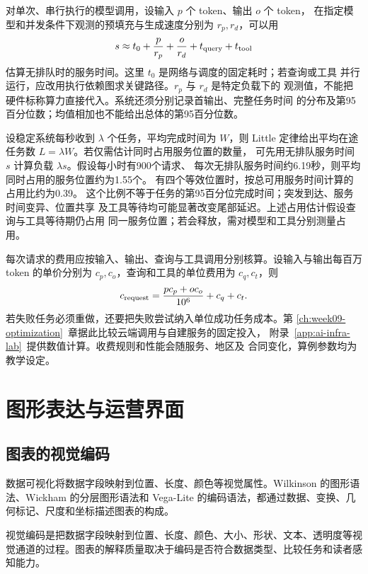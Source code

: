 对单次、串行执行的模型调用，设输入 \(p\) 个 token、输出 \(o\) 个 token，
在指定模型和并发条件下观测的预填充与生成速度分别为 \(r_p,r_d\)，可以用
\[
  s\approx t_0+\frac{p}{r_p}+\frac{o}{r_d}
       +t_{\rm query}+t_{\rm tool}
\]
估算无排队时的服务时间。这里 \(t_0\) 是网络与调度的固定耗时；若查询或工具
并行运行，应改用执行依赖图求关键路径。\(r_p\) 与 \(r_d\) 是特定负载下的
观测值，不能把硬件标称算力直接代入。系统还须分别记录首输出、完整任务时间
的分布及第95百分位数；均值相加也不能给出总体的第95百分位数。

设稳定系统每秒收到 \(\lambda\) 个任务，平均完成时间为 \(W\)，则 Little
定律给出平均在途任务数 \(L=\lambda W\)。若仅需估计同时占用服务位置的数量，
可先用无排队服务时间 \(s\) 计算负载 \(\lambda s\)。假设每小时有900个请求、
每次无排队服务时间约6.19秒，则平均同时占用的服务位置约为1.55个。
有四个等效位置时，按总可用服务时间计算的占用比约为0.39。
这个比例不等于任务的第95百分位完成时间；突发到达、服务时间变异、位置共享
及工具等待均可能显著改变尾部延迟。上述占用估计假设查询与工具等待期仍占用
同一服务位置；若会释放，需对模型和工具分别测量占用。

每次请求的费用应按输入、输出、查询与工具调用分别核算。设输入与输出每百万 token 的单价分别为
\(c_p,c_o\)，查询和工具的单位费用为 \(c_q,c_t\)，则
\[
  c_{\rm request}=
    \frac{p c_p+o c_o}{10^6}+c_q+c_t.
\]
若失败任务必须重做，还要把失败尝试纳入单位成功任务成本。第
\ref{ch:week09-optimization}~章据此比较云端调用与自建服务的固定投入，
附录~\ref{app:ai-infra-lab}~提供数值计算。收费规则和性能会随服务、地区及
合同变化，算例参数均为教学设定。

\section{图形表达与运营界面}
\subsection{图表的视觉编码}

数据可视化将数据字段映射到位置、长度、颜色等视觉属性。Wilkinson 的图形语法、Wickham 的分层图形语法和 Vega-Lite 的编码语法，都通过数据、变换、几何标记、尺度和坐标描述图表的构成。

\begin{definition}[视觉编码]
视觉编码是把数据字段映射到位置、长度、颜色、大小、形状、文本、透明度等视觉通道的过程。图表的解释质量取决于编码是否符合数据类型、比较任务和读者感知能力。
\end{definition}

